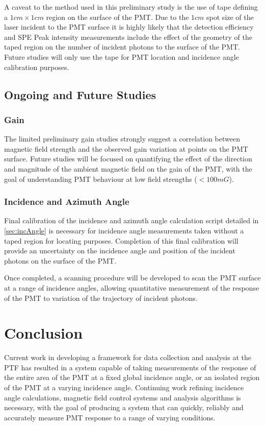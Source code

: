\documentclass[journal]{IEEEtran}
\begin{document}
A caveat to the method used in this preliminary study is the use of tape defining a $1cm\times1cm$ region on the surface of the PMT.  Due to the $1cm$ spot size of the laser incident to the PMT surface it is highly likely that the detection efficiency and SPE Peak intensity measurements include the effect of the geometry of the taped region on the number of incident photons to the surface of the PMT. Future studies will only use the tape for PMT location and incidence angle calibration purposes.

\subsection{Ongoing and Future Studies}

\subsubsection{Gain}

The limited preliminary gain studies strongly suggest a correlation between magnetic field strength and the observed gain variation at points on the PMT surface.  Future studies will be focused on quantifying the effect of the direction and magnitude of the ambient magnetic field on the gain of the PMT, with the goal of understanding PMT behaviour at low field strengths ($<100mG$).

\subsubsection{Incidence and Azimuth Angle}
Final calibration of the incidence and azimuth angle calculation script detailed in \ref{sec:incAngle} is necessary for incidence angle measurements taken without a taped region for locating purposes.  Completion of this final calibration will provide an uncertainty on the incidence angle and position of the incident photons on the surface of the PMT. 

Once completed, a scanning procedure will be developed to scan the PMT surface at a range of incidence angles, allowing quantitative measurement of the response of the PMT to variation of the trajectory of incident photons. 

\section{Conclusion}

Current work in developing a framework for data collection and analysis at the PTF has resulted in a system capable of taking measurements of the response of the entire area of the PMT at a fixed global incidence angle, or an isolated region of the PMT at a varying incidence angle.  Continuing work refining incidence angle calculations, magnetic field control systems and analysis algorithms is necessary, with the goal of producing a system that can quickly, reliably and accurately measure PMT response to a range of varying conditions.  
\end{document}
